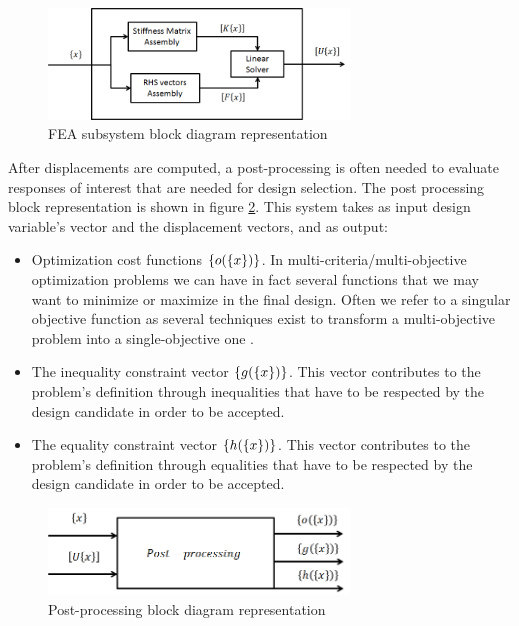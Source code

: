 \begin{figure}[ht]
\centering
\includegraphics[width=8cm]{images/Ch2/Block_diagram_FEA_det}
\caption{FEA subsystem block diagram representation}
\label{fig.2.3}
\end{figure}
After displacements are computed, a post-processing is often needed to evaluate responses of interest that are needed for design selection.
The post processing block representation is shown in figure \ref{fig.2.4}. This system takes as input design variable's vector and the displacement vectors, and as output:
\begin{itemize}
\item Optimization cost functions $\left\lbrace{o(\ensuremath\left\lbrace{x}\right \rbrace)}\right \rbrace$. In multi-criteria/multi-objective optimization problems we can have in fact several functions that we may want to minimize or maximize in the final design. Often we refer to a singular objective function as several techniques exist to transform a multi-objective problem into a single-objective one \cite{marler2004survey}.
\item The inequality constraint vector $\left\lbrace{g(\ensuremath\left\lbrace{x}\right \rbrace)}\right \rbrace$. This vector contributes to the problem's definition through inequalities that have to be respected by the design candidate in order to be accepted.
\item The equality constraint vector $\left\lbrace{h(\ensuremath\left\lbrace{x}\right \rbrace)}\right \rbrace$. This vector contributes to the problem's definition through equalities that have to be respected by the design candidate in order to be accepted.
\end{itemize} 
\begin{figure}[ht]
\centering
\includegraphics[width=8cm]{images/Ch2/Post_processing}
\caption{Post-processing block diagram representation}
\label{fig.2.4}
\end{figure}
